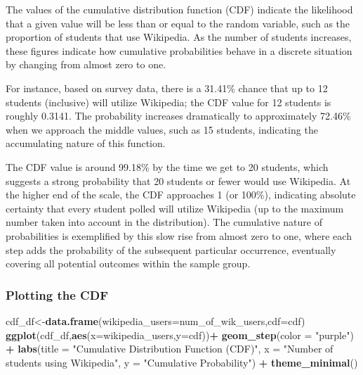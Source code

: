 \documentclass[
]{article}
\newenvironment{Shaded}{\begin{snugshade}}{\end{snugshade}}
\newcommand{\AttributeTok}[1]{\textcolor[rgb]{0.13,0.29,0.53}{#1}}
\newcommand{\FunctionTok}[1]{\textcolor[rgb]{0.13,0.29,0.53}{\textbf{#1}}}
\newcommand{\NormalTok}[1]{#1}
\newcommand{\OtherTok}[1]{\textcolor[rgb]{0.56,0.35,0.01}{#1}}
\newcommand{\SpecialCharTok}[1]{\textcolor[rgb]{0.81,0.36,0.00}{\textbf{#1}}}
\newcommand{\StringTok}[1]{\textcolor[rgb]{0.31,0.60,0.02}{#1}}
\begin{document}
The values of the cumulative distribution function (CDF) indicate the
likelihood that a given value will be less than or equal to the random
variable, such as the proportion of students that use Wikipedia. As the
number of students increases, these figures indicate how cumulative
probabilities behave in a discrete situation by changing from almost
zero to one.

For instance, based on survey data, there is a 31.41\% chance that up to
12 students (inclusive) will utilize Wikipedia; the CDF value for 12
students is roughly 0.3141. The probability increases dramatically to
approximately 72.46\% when we approach the middle values, such as 15
students, indicating the accumulating nature of this function.

The CDF value is around 99.18\% by the time we get to 20 students, which
suggests a strong probability that 20 students or fewer would use
Wikipedia. At the higher end of the scale, the CDF approaches 1 (or
100\%), indicating absolute certainty that every student polled will
utilize Wikipedia (up to the maximum number taken into account in the
distribution). The cumulative nature of probabilities is exemplified by
this slow rise from almost zero to one, where each step adds the
probability of the subsequent particular occurrence, eventually covering
all potential outcomes within the sample group.

\subsubsection{Plotting the CDF}\label{plotting-the-cdf}

\begin{Shaded}
\begin{Highlighting}[]
\NormalTok{cdf\_df}\OtherTok{\textless{}{-}}\FunctionTok{data.frame}\NormalTok{(}\AttributeTok{wikipedia\_users=}\NormalTok{num\_of\_wik\_users,}\AttributeTok{cdf=}\NormalTok{cdf)}
\FunctionTok{ggplot}\NormalTok{(cdf\_df,}\FunctionTok{aes}\NormalTok{(}\AttributeTok{x=}\NormalTok{wikipedia\_users,}\AttributeTok{y=}\NormalTok{cdf))}\SpecialCharTok{+}
  \FunctionTok{geom\_step}\NormalTok{(}\AttributeTok{color =} \StringTok{"purple"}\NormalTok{) }\SpecialCharTok{+}
  \FunctionTok{labs}\NormalTok{(}\AttributeTok{title =} \StringTok{"Cumulative Distribution Function (CDF)"}\NormalTok{,}
       \AttributeTok{x =} \StringTok{"Number of students using Wikipedia"}\NormalTok{,}
       \AttributeTok{y =} \StringTok{"Cumulative Probability"}\NormalTok{) }\SpecialCharTok{+}
  \FunctionTok{theme\_minimal}\NormalTok{()}
\end{Highlighting}
\end{Shaded}
\end{document}
